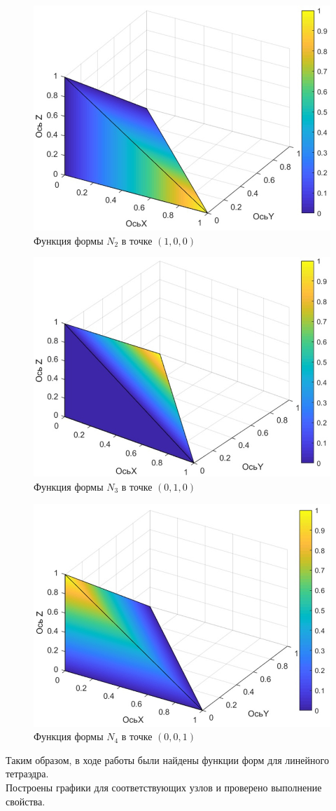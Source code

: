 \documentclass[12pt]{article}
\begin{document}
\begin{figure}[h]

\centering

\includegraphics[width=0.6\linewidth]{2.jpg}

\caption{Функция формы $N_2$ в точке $(1,0,0)$}

\label{fig:mpr}

\end{figure}

\newpage
\begin{figure}[h]

\centering

\includegraphics[width=0.6\linewidth]{3.jpg}

\caption{Функция формы $N_3$ в точке $(0,1,0)$}

\label{fig:mpr}

\end{figure}

\begin{figure}[h]

\centering

\includegraphics[width=0.6\linewidth]{4.jpg}

\caption{Функция формы $N_4$ в точке $(0,0,1)$}

\label{fig:mpr}

\end{figure}

Таким образом, в ходе работы были найдены функции форм для линейного тетраэдра.\\
Построены графики для соответствующих узлов и проверено выполнение свойства.
\end{document}
